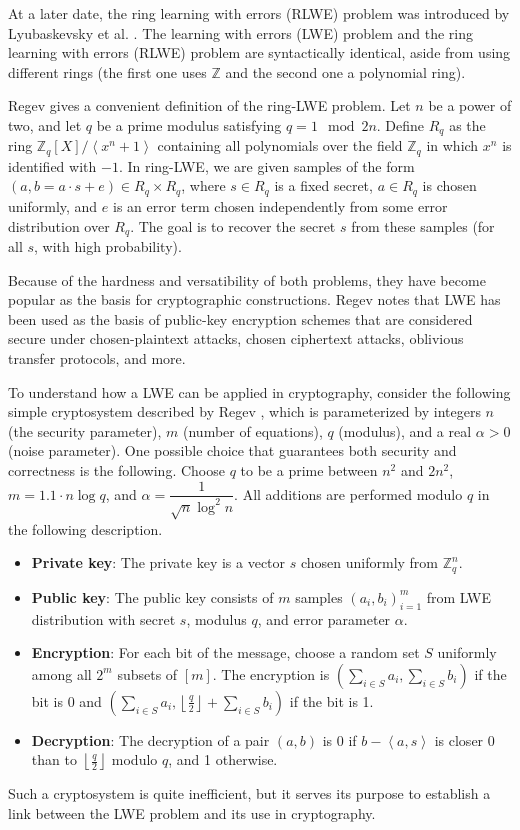 At a later date, the ring learning with errors (RLWE) problem was introduced by Lyubaskevsky et al. \cite{rlwe2010}. The learning with errors (LWE) problem and the ring learning with errors (RLWE) problem are syntactically identical, aside from using different rings (the first one uses $\mathbb{Z}$ and the second one a polynomial ring). 

Regev \cite{regevlearning} gives a convenient definition of the ring-LWE problem. Let $n$ be a power of two, and let $q$ be a prime modulus satisfying $q=1 \mod 2n$. Define $R_{q}$ as the ring $\mathbb{Z}_{q}[X] / \left \langle x^{n} + 1 \right \rangle$ containing all polynomials over the field $\mathbb{Z}_{q}$ in which $x^{n}$ is identified with $-1$. In ring-LWE, we are given samples of the form $(a, b = a \cdot s + e) \in R_{q} \times R_{q}$, where $s \in R_{q}$ is a fixed secret, $a \in R_{q}$ is chosen uniformly, and $e$ is an error term chosen independently from some error distribution over $R_{q}$. The goal is to recover the secret $s$ from these samples (for all $s$, with high probability).

Because of the hardness and versatibility of both problems, they have become popular as the basis for cryptographic constructions. Regev \cite{regevlearning} notes that LWE has been used as the basis of public-key encryption schemes that are considered secure under chosen-plaintext attacks, chosen ciphertext attacks, oblivious transfer protocols, and more.

To understand how a LWE can be applied in cryptography, consider the following simple cryptosystem described by Regev \cite{regevlearning}, which is parameterized by integers $n$ (the security parameter), $m$ (number of equations), $q$ (modulus), and a real $\alpha > 0$ (noise parameter). One possible choice that guarantees both security and correctness is the following. Choose $q$ to be a prime between $n^2$ and $2n^2$, $m=1.1 \cdot n\log q$, and $\alpha = \dfrac{1}{\sqrt{n} \log^{2}n}$. All additions are performed modulo $q$ in the following description. 

\begin{itemize}
\item \textbf{Private key}: The private key is a vector $s$ chosen uniformly from $\mathbb{Z}_{q}^{n}$.
\item \textbf{Public key}: The public key consists of $m$ samples $(a_{i}, b_{i})_{i=1}^m$ from LWE distribution with secret $s$, modulus $q$, and error parameter $\alpha$.
\item \textbf{Encryption}: For each bit of the message, choose a random set $S$ uniformly among all $2^m$ subsets of $[m]$. The encryption is $(\sum_{i \in S} a_{i}, \sum_{i \in S} b_{i})$ if the bit is 0 and $(\sum_{i \in S} a_{i}, \left \lfloor{\frac{q}{2}}\right \rfloor + \sum_{i \in S} b_{i})$ if the bit is 1.
\item \textbf{Decryption}: The decryption of a pair $(a,b)$ is 0 if $b - \left \langle a,s \right \rangle$ is closer 0 than to $\left \lfloor \frac{q}{2} \right \rfloor$ modulo $q$, and 1 otherwise. 
\end{itemize}
Such a cryptosystem is quite inefficient, but it serves its purpose to establish a link between the LWE problem and its use in cryptography.

